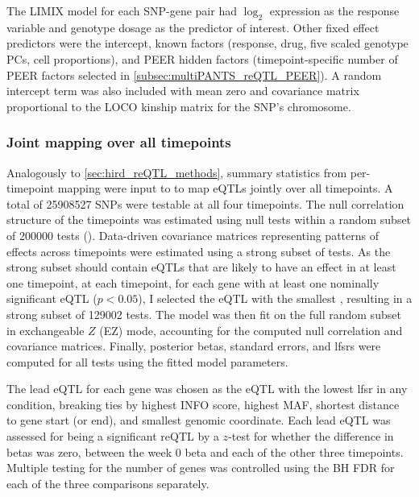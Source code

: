 The {LIMIX} model for each \gls{SNP}-gene pair had 
$\log_2$ expression as the response variable
and genotype dosage as the predictor of interest.
Other fixed effect predictors were
the intercept,
known factors (response, drug, five scaled genotype \glspl{PC}, cell proportions), 
and PEER hidden factors (timepoint-specific number of PEER factors selected in \cref{subsec:multiPANTS_reQTL_PEER}).
A random intercept term was also included with mean zero and covariance matrix proportional to the \gls{LOCO} kinship matrix for the \gls{SNP}'s chromosome.

\subsubsection{Joint  mapping over all timepoints}

Analogously to \cref{sec:hird_reQTL_methods},
summary statistics from per-timepoint mapping were input to  \autocite{urbut2018FlexibleStatisticalMethods} to map \glspl{eQTL} jointly over all timepoints.
A total of \num{25908527} \glspl{SNP} were testable at all four timepoints.
The null correlation structure of the timepoints was estimated using null tests within a random subset of \num{200000} tests ().
Data-driven covariance matrices representing patterns of effects across timepoints were estimated using a strong subset of tests.
As the strong subset should contain \glspl{eQTL} that are likely to have an effect in at least one timepoint,
at each timepoint, for each gene with at least one nominally significant \gls{eQTL} ($p < 0.05$), I selected the \gls{eQTL} with the smallest \pvalue{}, resulting in a strong subset of \num{129002} tests.
The  model was then fit on the full random subset in exchangeable $Z$ (EZ) mode, accounting for the computed null correlation and covariance matrices.
Finally, posterior betas, standard errors, and \glspl{lfsr} were computed for all tests using the fitted model parameters.

The lead \gls{eQTL} for each gene was chosen as the \gls{eQTL} with the lowest \gls{lfsr} in any condition, 
breaking ties by highest INFO score, highest \gls{MAF}, shortest distance to gene start (or end), and smallest genomic coordinate.
Each lead \gls{eQTL} was assessed for being a significant \gls{reQTL} by a $z$-test for whether the difference in betas was zero, between the week 0 beta and each of the other three timepoints.
Multiple testing for the number of genes was controlled using the \gls{BH} \gls{FDR} for each of the three comparisons separately.

